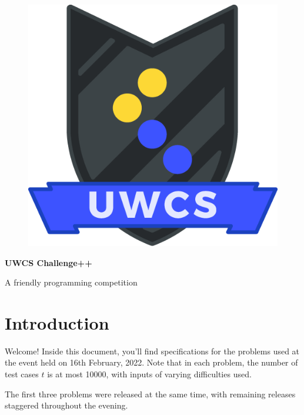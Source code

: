 \documentclass[a4paper,12pt,parskip=half-]{scrartcl}
\begin{document}
\begin{figure}
    \vspace{-10pt} %
    \includegraphics[width=0.8\linewidth]{shield.png} %
    \vspace{-100pt} %
\end{figure}

\normalfont \Huge \bfseries UWCS Challenge++

\normalfont\Large A friendly programming competition
\normalsize

\section*{Introduction}

Welcome! 
Inside this document, you'll find specifications for the problems used at the event held on 16th February, 2022. 
Note that in each problem, the number of test cases $t$ is at most 10000, with inputs of varying difficulties used.

The first three problems were released at the same time, with remaining releases staggered throughout the evening.



\tableofcontents

\newpage



\newpage

\newpage

\newpage

\newpage

\end{document}
